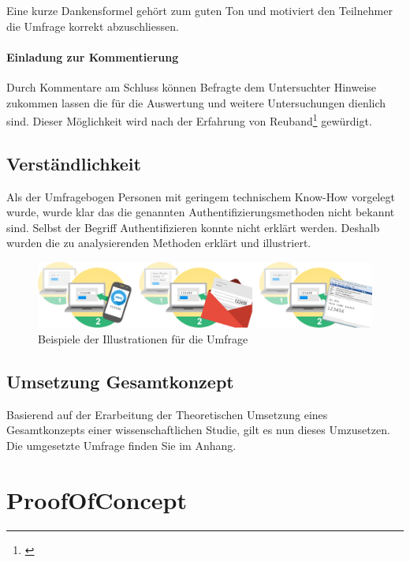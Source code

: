 Eine kurze Dankensformel gehört zum guten Ton und motiviert den
Teilnehmer die Umfrage korrekt abzuschliessen.

\subsubsection{Einladung zur
Kommentierung}\label{einladung-zur-kommentierung}

Durch Kommentare am Schluss können Befragte dem Untersuchter Hinweise
zukommen lassen die für die Auswertung und weitere Untersuchungen
dienlich sind. Dieser Möglichkeit wird nach der Erfahrung von
Reuband\footnote{\autocite{kzfss01}} gewürdigt.

\section{Verständlichkeit}\label{verstuxe4ndlichkeit}

Als der Umfragebogen Personen mit geringem technischem Know-How
vorgelegt wurde, wurde klar das die genannten Authentifizierungsmethoden
nicht bekannt sind. Selbst der Begriff Authentifizieren konnte nicht
erklärt werden. Deshalb wurden die zu analysierenden Methoden erklärt
und illustriert.

\begin{figure}[htbp]
\centering
\includegraphics{images/studien-ilustrationen.jpg}
\caption{Beispiele der Illustrationen für die Umfrage}
\end{figure}

\section{Umsetzung Gesamtkonzept}\label{umsetzung-gesamtkonzept}

Basierend auf der Erarbeitung der Theoretischen Umsetzung eines
Gesamtkonzepts einer wissenschaftlichen Studie, gilt es nun dieses
Umzusetzen. Die umgesetzte Umfrage finden Sie im Anhang.

\chapter{ProofOfConcept}\label{proofofconcept}

